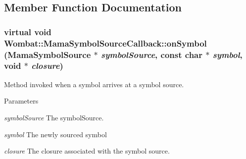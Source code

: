 \subsection{Member Function Documentation}
\hypertarget{classWombat_1_1MamaSymbolSourceCallback_aff08844362e9cbad87320610ee25c8f8}{
\subsubsection[{onSymbol}]{\setlength{\rightskip}{0pt plus 5cm}virtual void Wombat::MamaSymbolSourceCallback::onSymbol ({\bf MamaSymbolSource} $\ast$ {\em symbolSource}, \/  const char $\ast$ {\em symbol}, \/  void $\ast$ {\em closure})}}
\label{classWombat_1_1MamaSymbolSourceCallback_aff08844362e9cbad87320610ee25c8f8}


Method invoked when a symbol arrives at a symbol source. 
\begin{DoxyParams}{Parameters}
\item[{\em symbolSource}]The symbolSource. \item[{\em symbol}]The newly sourced symbol \item[{\em closure}]The closure associated with the symbol source. \end{DoxyParams}
